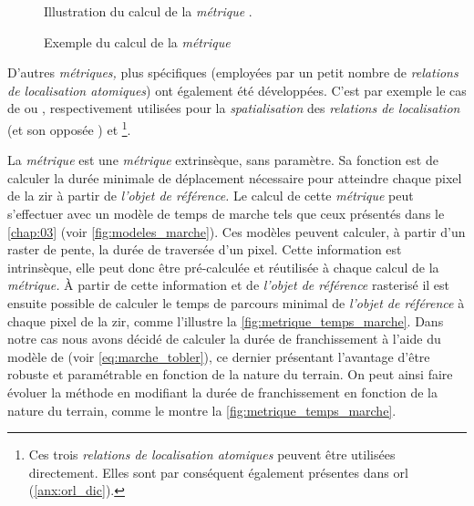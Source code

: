 \begin{wrapfigure}{o}{4cm}
  \centering
  
  \caption{Illustration du calcul de la \emph{métrique}
    \protect{}.}
  \label{fig:calc_direction_de}
\end{wrapfigure}

\begin{figure}
  \centering
  
  \caption{Exemple du calcul de la \emph{métrique}
    \protect{}}
  \label{fig:metrique_direction_de}
\end{figure}

D'autres \emph{métriques,} plus spécifiques (\ie employées par un
petit nombre de \emph{relations de localisation atomiques}) ont
également été développées. C'est par exemple le cas de
 ou , respectivement
utilisées pour la \emph{spatialisation} des \emph{relations de
  localisation}  (et son opposée
) et 
\footnote{Ces trois \emph{relations de localisation atomiques} peuvent
  être utilisées directement. Elles sont par conséquent également
  présentes dans \ac{orl} (\autoref{anx:orl_dic}).}.

La \emph{métrique}  est une \emph{métrique}
extrinsèque, sans paramètre. Sa fonction est de calculer la durée
minimale de déplacement nécessaire pour atteindre chaque pixel de la
\ac{zir} à partir de \emph{l'objet de référence.} Le calcul de cette
\emph{métrique} peut s'effectuer avec un modèle de temps de marche
tels que ceux présentés dans le \autoref{chap:03} (voir
\autoref{fig:modeles_marche}). Ces modèles peuvent calculer, à partir
d'un raster de pente, la durée de traversée d'un pixel. Cette
information est intrinsèque, elle peut donc être pré-calculée et
réutilisée à chaque calcul de la \emph{métrique.} À partir de cette
information et de \emph{l'objet de référence} rasterisé il est ensuite
possible de calculer le temps de parcours minimal de \emph{l'objet de
  référence} à chaque pixel de la \ac{zir}, comme l'illustre la
\autoref{fig:metrique_temps_marche}. Dans notre cas nous avons décidé
de calculer la durée de franchissement à l'aide du modèle de
\textcite{Tobler1993} (voir \autoref{eq:marche_tobler}), ce dernier
présentant l'avantage d'être robuste et paramétrable en fonction de la
nature du terrain. On peut ainsi faire évoluer la méthode en modifiant
la durée de franchissement en fonction de la nature du terrain, comme
le montre la \autoref{fig:metrique_temps_marche}.

